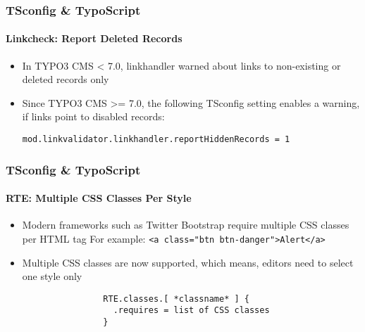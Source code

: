 
\begin{frame}[fragile]
	\frametitle{TSconfig \& TypoScript}
	\framesubtitle{Linkcheck: Report Deleted Records}

	\begin{itemize}
		\item In TYPO3 CMS < 7.0, linkhandler warned about links to non-existing or deleted records only
		\item Since TYPO3 CMS >=  7.0, the following TSconfig setting enables a warning, if links point to disabled records:

			\lstinline!mod.linkvalidator.linkhandler.reportHiddenRecords = 1!

	\end{itemize}

\end{frame}


\begin{frame}[fragile]
	\frametitle{TSconfig \& TypoScript}
	\framesubtitle{RTE: Multiple CSS Classes Per Style}

	\begin{itemize}
		\item Modern frameworks such as Twitter Bootstrap require multiple CSS classes per HTML tag\newline
			\small For example: \texttt{<a class="btn btn-danger">Alert</a>}\normalsize
		\item Multiple CSS classes are now supported, which means, editors need to select one style only

			\begin{lstlisting}
				RTE.classes.[ *classname* ] {
				  .requires = list of CSS classes
				}
			\end{lstlisting}

	\end{itemize}

\end{frame}

